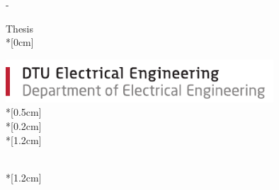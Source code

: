 \thispagestyle{empty}             %

\calccentering{\unitlength}
\begin{adjustwidth*}{\unitlength}{-\unitlength}
    \begin{adjustwidth}{-0.5cm}{-0.5cm}
        \sffamily
		\vspace*{1cm}        
        \begin{flushright}        
            \thesistypeabbr{} Thesis\\*[0cm]
            \thesistype{}\\
        \end{flushright}
        \vspace*{\fill}
        \noindent
        \includegraphics[width=0.75\textwidth]{graphics/DTU-Elektro-B-UK}\\*[0.5cm]
        \Huge \thesistitle{}\\*[0.2cm]
        \LARGE \thesissubtitle{}\\*[1.2cm]
        \parbox[b]{0.5\linewidth}{%
            \large 
            \thesisauthor{}\\*[1.2cm]
            \normalsize
            \thesislocation{} \the\year
        }
        
    \end{adjustwidth}
\end{adjustwidth*}
\friezeColor
\normalfont
\normalsize
